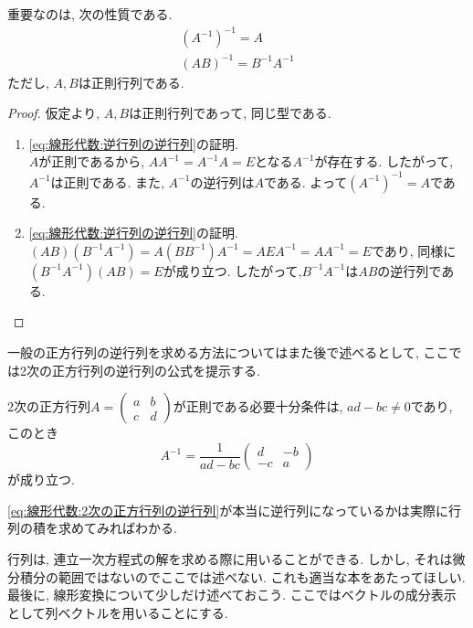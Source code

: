         重要なのは, 次の性質である.
        \begin{align}
            (A^{-1})^{-1}=A \label{eq:線形代数:逆行列の逆行列}\\
            (AB)^{-1}=B^{-1}A^{-1} \label{eq:線形代数:積の逆行列}
        \end{align}
        ただし, $A,B$は正則行列である.
        \begin{proof} 仮定より, $A,B$は正則行列であって, 同じ型である.
            \begin{enumerate}
                \item \eqref{eq:線形代数:逆行列の逆行列}の証明.\\
                $A$が正則であるから, $AA^{-1}=A^{-1}A=E$となる$A^{-1}$が存在する. したがって, $A^{-1}$は正則である. また, $A^{-1}$の逆行列は$A$である.
                よって$(A^{-1})^{-1}=A$である.
                \item \eqref{eq:線形代数:逆行列の逆行列}の証明.\\
                $(AB)(B^{-1}A^{-1})=A(BB^{-1})A^{-1}=AEA^{-1}=AA^{-1}=E$であり, 同様に$(B^{-1}A^{-1})(AB)=E$が成り立つ.
                したがって,$B^{-1}A^{-1}$は$AB$の逆行列である.
            \end{enumerate}
        \end{proof}

        一般の正方行列の逆行列を求める方法についてはまた後で述べるとして, ここでは2次の正方行列の逆行列の公式を提示する.
        \begin{screen}
        2次の正方行列$\displaystyle A=\begin{pmatrix}a & b \\ c & d\end{pmatrix}$が正則である必要十分条件は, $ad-bc\neq 0$であり, このとき
        \begin{equation}
            A^{-1}=\frac{1}{ad-bc}\begin{pmatrix}d & -b \\ -c & a\end{pmatrix} \label{eq:線形代数:2次の正方行列の逆行列}
        \end{equation}
        が成り立つ.
        \end{screen}
        \eqref{eq:線形代数:2次の正方行列の逆行列}が本当に逆行列になっているかは実際に行列の積を求めてみればわかる.

        行列は, 連立一次方程式の解を求める際に用いることができる. しかし, それは微分積分の範囲ではないのでここでは述べない. これも適当な本をあたってほしい.
        \clearpage
        最後に, 線形変換について少しだけ述べておこう. ここではベクトルの成分表示として列ベクトルを用いることにする.

